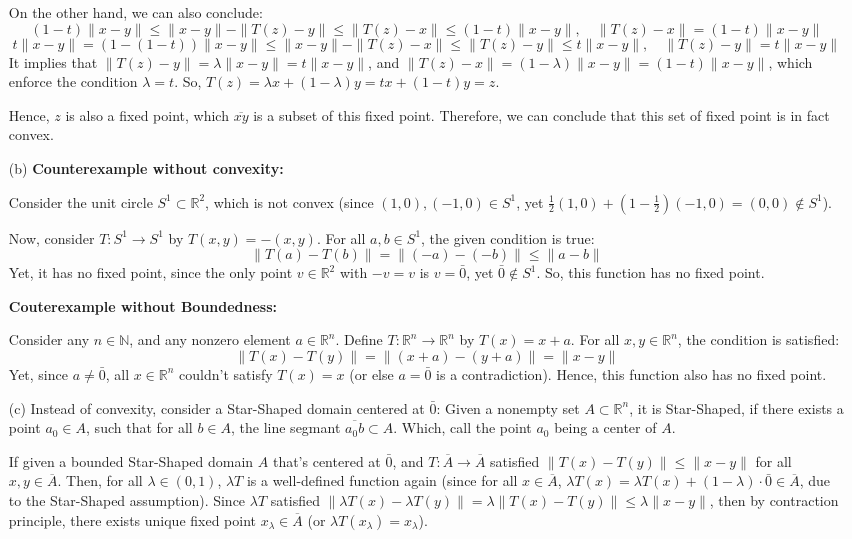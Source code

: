 \documentclass{article}
\begin{document}
\begin{itemize}
    On the other hand, we can also conclude:
    $$(1-t)\|x-y\| \leq \|x-y\|-\|T(z)-y\| \leq \|T(z)-x\| \leq (1-t)\|x-y\|,\quad \|T(z)-x\| = (1-t)\|x-y\|$$
    $$t\|x-y\| = (1-(1-t))\|x-y\| \leq \|x-y\|-\|T(z)-x\| \leq \|T(z)-y\| \leq t\|x-y\|,\quad \|T(z)-y\|=t\|x-y\|$$
    It implies that $\|T(z)-y\|=\lambda\|x-y\|=t\|x-y\|$, and $\|T(z)-x\|=(1-\lambda)\|x-y\|=(1-t)\|x-y\|$, which enforce the condition $\lambda =t$.
    So, $T(z)=\lambda x+(1-\lambda)y = tx+(1-t)y=z$.

    Hence, $z$ is also a fixed point, which $\overline{xy}$ is a subset of this fixed point. Therefore, we can conclude that this set of fixed point is in fact convex.

    
    \hfil

    \item[(b)] \textbf{Counterexample without convexity:}
    
    Consider the unit circle $S^1 \subset \mathbb{R}^2$, which is not convex (since $(1,0), (-1,0)\in S^1$, yet $\frac{1}{2}(1,0)+(1-\frac{1}{2})(-1,0)=(0,0)\notin S^1$).

    Now, consider $T:S^1\rightarrow S^1$ by $T(x,y)=-(x,y)$. For all $a,b\in S^1$, the given condition is true:
    $$\|T(a)-T(b)\| = \|(-a)-(-b)\| \leq \|a-b\|$$
    Yet, it has no fixed point, since the only point $v\in \mathbb{R}^2$ with $-v = v$ is $v=\bar{0}$, yet $\bar{0}\notin S^1$.
    So, this function has no fixed point.

    \hfil

    \textbf{Couterexample without Boundedness:}

    Consider any $n\in\mathbb{N}$, and any nonzero element $a\in\mathbb{R}^n$. Define $T:\mathbb{R}^n\rightarrow\mathbb{R}^n$ by $T(x)=x+a$.
    For all $x,y\in \mathbb{R}^n$, the condition is satisfied:
    $$\|T(x)-T(y)\| = \|(x+a)-(y+a)\| = \|x-y\|$$
    Yet, since $a\neq \bar{0}$, all $x\in\mathbb{R}^n$ couldn't satisfy $T(x)=x$ (or else $a=\bar{0}$ is a contradiction). Hence, this function also has no fixed point.

    \hfil

    \item[(c)] Instead of convexity, consider a Star-Shaped domain centered at $\bar{0}$: Given a nonempty set $A\subset \mathbb{R}^n$, it is Star-Shaped,
    if there exists a point $a_0\in A$, such that for all $b\in A$, the line segmant $\overline{a_0b}\subset A$. Which, call the point $a_0$ being a center of $A$.

    If given a bounded Star-Shaped domain $A$ that's centered at $\bar{0}$, and $T:\overline{A}\rightarrow\overline{A}$ satisfied $\|T(x)-T(y)\|\leq \|x-y\|$ for all $x,y\in \overline{A}$.
    Then, for all $\lambda\in (0,1)$, $\lambda T$ is a well-defined function again (since for all $x\in \overline{A}$, $\lambda T(x) = \lambda T(x)+(1-\lambda)\cdot \bar{0} \in \overline{A}$, due to the Star-Shaped assumption).
    Since $\lambda T$ satisfied $\|\lambda T(x)-\lambda T(y)\|= \lambda \|T(x)-T(y)\|\leq \lambda\|x-y\|$, then by contraction principle, there exists unique fixed point $x_\lambda\in\overline{A}$ (or $\lambda T(x_\lambda)=x_\lambda$).


\end{itemize}
\end{document}
